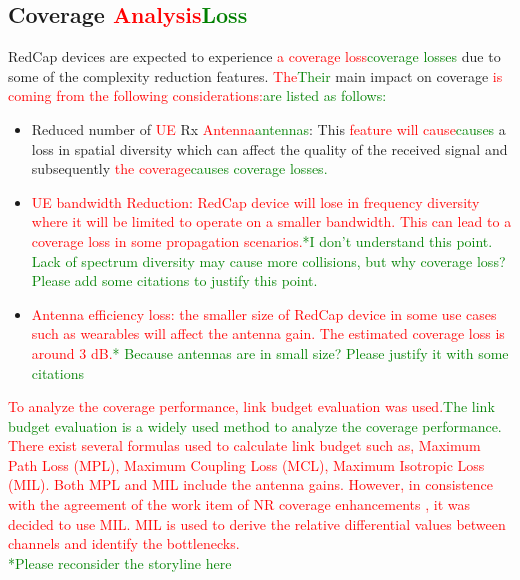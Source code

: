 \documentclass[]{IEEEtran}
\newcommand{\CAREPL}[2]{\textcolor{red}{#1}\textcolor{green}{#2}}
\begin{document}
\subsection{Coverage \CAREPL{Analysis}{Loss}}
\label{sec:6-1}


RedCap devices are expected to experience \CAREPL{a coverage loss}{coverage losses} due to some of the complexity reduction features. 
\CAREPL{The}{Their} main impact on coverage \CAREPL{is coming from the following considerations:}{are listed as follows:}
\begin{itemize}
    \item Reduced number of \CAREPL{UE}{} Rx \CAREPL{Antenna}{antennas}: This \CAREPL{feature will cause}{causes} a loss in spatial diversity which can affect the quality of the received signal and subsequently \CAREPL{the coverage}{causes coverage losses.} 
    \item \CAREPL{UE bandwidth Reduction: RedCap device will lose in frequency diversity where it will be limited to operate on a smaller bandwidth. This can lead to a coverage loss in some propagation scenarios.}{*I don't understand this point. Lack of spectrum diversity may cause more collisions, but why coverage loss? Please add some citations to justify this point.}
    \item \CAREPL{Antenna efficiency loss: the smaller size of RedCap device in some use cases such as wearables will affect the antenna gain. The estimated coverage loss is around 3 dB.}{* Because antennas are in small size? Please justify it with some citations}
\end{itemize}

\CAREPL{To analyze the coverage performance, link budget evaluation was used.}{The link budget evaluation is a widely used method to analyze the coverage performance.} 
\CAREPL{There exist several formulas used to calculate link budget such as, Maximum Path Loss (MPL), Maximum Coupling Loss (MCL), Maximum Isotropic Loss (MIL). Both MPL and MIL include the antenna gains. 
However, in consistence with the agreement of the work item of NR coverage enhancements \cite{3gpp_study_nodate-3_38.830}, it was decided to use MIL. MIL is used to derive the relative differential values between channels and identify the bottlenecks.\\}{*Please reconsider the storyline here}
\end{document}
